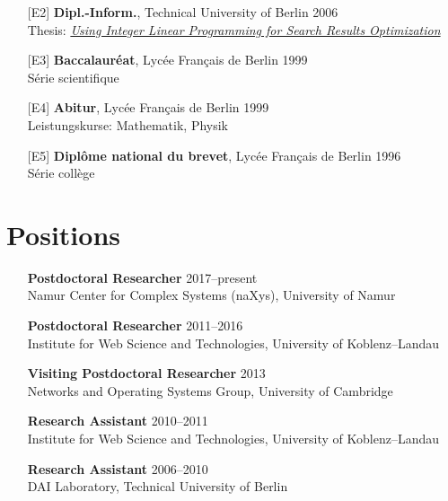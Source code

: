 \documentclass[line,mm]{res}
\newcounter{x}
\newcounter{y}
\begin{document}
\begin{resume}
\begin{itemize}
\item[{[E2]}]
\textbf{Dipl.-Inform.}, Technical University of Berlin \hfill 2006 \\
Thesis: \emph{\href{https://pdfs.semanticscholar.org/42ca/e9b00864ee09bc9bc92ef3d411e20b966a8d.pdf}{Using Integer Linear Programming for Search Results Optimization}}

\item[{[E3]}]
\textbf{Baccalauréat}, Lycée Français de Berlin \hfill 1999 \\
Série scientifique

\item[{[E4]}]
\textbf{Abitur}, Lycée Français de Berlin \hfill 1999 \\
Leistungskurse:  Mathematik, Physik 

\item[{[E5]}]
\textbf{Diplôme national du brevet}, Lycée Français de Berlin \hfill 1996 \\
Série collège

\end{itemize}

\section{Positions}

\begin{itemize}

\item[]
\textbf{Postdoctoral Researcher} \hfill 2017--present \\
Namur Center for Complex Systems (naXys), University of Namur 

\item[]
\textbf{Postdoctoral Researcher} \hfill 2011--2016 \\
Institute for Web Science and Technologies, University of Koblenz--Landau 

\item[]
\textbf{Visiting Postdoctoral Researcher} \hfill 2013 \\
Networks and Operating Systems Group, University of Cambridge

\item[]
\textbf{Research Assistant} \hfill 2010--2011 \\
Institute for Web Science and Technologies, University of Koblenz--Landau 

\item[]
\textbf{Research Assistant} \hfill 2006--2010 \\
DAI Laboratory, Technical University of Berlin 


\end{itemize}
\end{resume}
\end{document}
